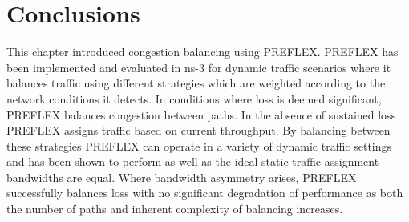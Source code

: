\section{Conclusions}


This chapter introduced congestion balancing using \ac{PREFLEX}.  
\ac{PREFLEX} has been implemented and evaluated in ns-3 for dynamic traffic scenarios where it balances traffic using different strategies which are weighted according to the network conditions it detects.  
In conditions where loss is deemed significant, \ac{PREFLEX} balances congestion between paths.  
In the absence of sustained loss \ac{PREFLEX} assigns traffic based on current throughput.  
By balancing between these strategies \ac{PREFLEX} can operate in a variety of dynamic traffic settings and has been shown to perform as well as the ideal static traffic assignment bandwidths are equal. 
Where bandwidth asymmetry arises, \ac{PREFLEX} successfully balances loss with no significant degradation of performance as both the number of paths and inherent complexity of balancing increases. 

